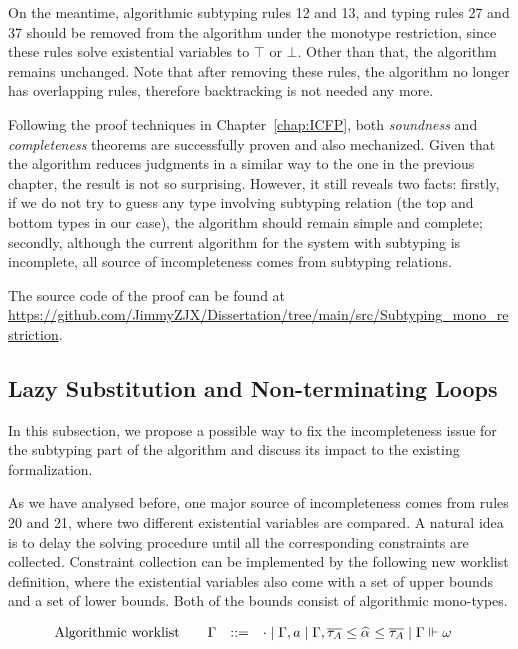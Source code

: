 On the meantime, algorithmic subtyping rules 12 and 13, and typing rules 27 and 37
should be removed from the algorithm under the monotype restriction,
since these rules solve existential variables to $\top$ or $\bot$.
Other than that, the algorithm remains unchanged.
Note that after removing these rules,
the algorithm no longer has overlapping rules,
therefore backtracking is not needed any more.

Following the proof techniques in Chapter~\ref{chap:ICFP},
both \emph{soundness} and \emph{completeness} theorems
are successfully proven and also mechanized.
Given that the algorithm reduces judgments in a similar way to the one in the previous chapter,
the result is not so surprising.
However, it still reveals two facts:
firstly, if we do not try to guess any type involving subtyping relation
(the top and bottom types in our case),
the algorithm should remain simple and complete;
secondly, although the current algorithm for the system with subtyping is incomplete,
all source of incompleteness comes from subtyping relations.

\begin{sloppypar}
The source code of the proof can be found at \url{https://github.com/JimmyZJX/Dissertation/tree/main/src/Subtyping_mono_restriction}.
\end{sloppypar}

\subsection{Lazy Substitution and Non-terminating Loops}\label{subsec:lazy_subst}
In this subsection, we propose a possible way to fix the incompleteness issue
for the subtyping part of the algorithm and discuss its impact to the existing formalization.

As we have analysed before,
one major source of incompleteness comes from rules 20 and 21,
where two different existential variables are compared.
A natural idea is to delay the solving procedure until all the corresponding
constraints are collected.
Constraint collection can be implemented by the following new worklist definition,
where the existential variables also come with a set of upper bounds
and a set of lower bounds. Both of the bounds consist of algorithmic mono-types.

\begin{gather*}
    \begin{aligned}
        \text{Algorithmic worklist}\qquad&\Gm &::=&\quad \cdot \mid \Gm, a \mid \Gm, \overline{\tau_A} \le \al \le \overline{\tau_A} \mid \Gm \Vdash \jg
    \end{aligned}
\end{gather*}

